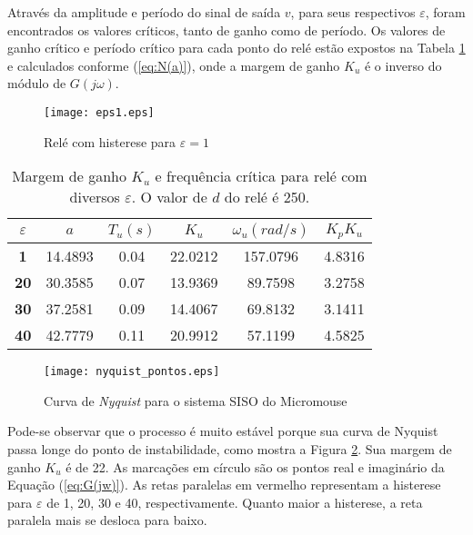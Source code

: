 	Através da amplitude e período do sinal de saída $v$, para seus respectivos $\varepsilon$, foram encontrados os valores críticos, tanto de ganho como de período. Os valores de ganho crítico e período crítico para cada ponto do relé estão expostos na Tabela \ref{tab:k_u} e calculados conforme (\ref{eq:N(a)}), onde a margem de ganho $K_u$ é o inverso do módulo de $G(j\omega)$. 

\begin{figure}[!htb]
	\caption{\label{fig:rele_siso}Relé com histerese para $\varepsilon = 1$}
	\begin{center}
		\texttt{[image: eps1.eps]}
	\end{center}
\end{figure}

\begin{table}[!htb]
	\centering
	\caption{\label{tab:k_u}Margem de ganho $K_u$ e frequência crítica para relé com diversos $\varepsilon$. O valor de $d$ do relé é 250.}
		
	\begin{tabular}{c|ccccc}
	$\varepsilon$ & $a$ & $T_u (s)$ & $K_u$ & $\omega_u (rad/s)$ & $K_pK_u$\\ 
	\hline 
	\textbf{1} &  14.4893 & 0.04 & 22.0212 & 157.0796 & 4.8316 \\ 
	\hline 
	\textbf{20} & 30.3585 & 0.07 & 13.9369 & 89.7598 & 3.2758\\ 
	\hline
	\textbf{30} & 37.2581 & 0.09 & 14.4067 & 69.8132 & 3.1411\\ 
	\hline 
	\textbf{40} & 42.7779 & 0.11 & 20.9912 & 57.1199 & 4.5825\\ 
	\end{tabular} 
	
\end{table}
	
\begin{figure}[!htb]
	\caption{\label{fig:nyquist_siso}Curva de \emph{Nyquist} para o sistema SISO do Micromouse}
	\begin{center}
		\texttt{[image: nyquist\_pontos.eps]}
	\end{center}
\end{figure}

	Pode-se observar que o processo é muito estável porque sua curva de Nyquist passa longe do ponto de instabilidade, como mostra a Figura \ref{fig:nyquist_siso}. Sua margem de ganho $K_u$ é de 22. As marcações em círculo são os pontos real e imaginário da Equação (\ref{eq:G(jw)}). As retas paralelas em vermelho representam a histerese para $\varepsilon$ de 1, 20, 30 e 40, respectivamente. Quanto maior a histerese, a reta paralela mais se desloca para baixo.

